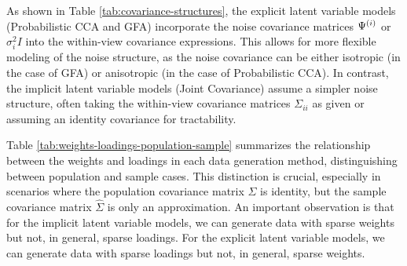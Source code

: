 As shown in Table \ref{tab:covariance-structures}, the explicit latent variable models (Probabilistic CCA and GFA) incorporate the noise covariance matrices $\Psi^{(i)}$ or $\sigma_i^2 I$ into the within-view covariance expressions. This allows for more flexible modeling of the noise structure, as the noise covariance can be either isotropic (in the case of GFA) or anisotropic (in the case of Probabilistic CCA). In contrast, the implicit latent variable models (Joint Covariance) assume a simpler noise structure, often taking the within-view covariance matrices $\Sigma_{ii}$ as given or assuming an identity covariance for tractability.

Table \ref{tab:weights-loadings-population-sample} summarizes the relationship between the weights and loadings in each data generation method, distinguishing between population and sample cases.
This distinction is crucial, especially in scenarios where the population covariance matrix \( \Sigma \) is identity, but the sample covariance matrix \( \hat{\Sigma} \) is only an approximation.
An important observation is that for the implicit latent variable models, we can generate data with sparse weights but not, in general, sparse loadings.
For the explicit latent variable models, we can generate data with sparse loadings but not, in general, sparse weights.

